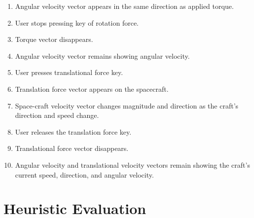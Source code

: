 \begin{enumerate}
\begin{enumerate}
  \item Angular velocity vector appears in the same direction as applied torque.

  \item User stops pressing key of rotation force.

  \item Torque vector disappears.

  \item Angular velocity vector remains showing angular velocity.

  \item User presses translational force key.

  \item Translation force vector appears on the spacecraft.

  \item Space-craft velocity vector changes magnitude and direction as the craft's direction and speed change.

  \item User releases the translation force key.

  \item Translational force vector disappears.

  \item Angular velocity and translational velocity vectors remain showing the craft's current speed, direction, and angular velocity.

\end{enumerate}

\end{enumerate}

\section{Heuristic Evaluation}

